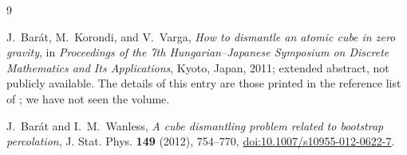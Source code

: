\documentclass[11pt]{amsart}
\begin{document}
\begin{thebibliography}{9}

J.~Bar\'at, M.~Korondi, and V.~Varga,
\emph{How to dismantle an atomic cube in zero gravity},
in \emph{Proceedings of the 7th Hungarian--Japanese Symposium on Discrete
Mathematics and Its Applications}, Kyoto, Japan, 2011; extended abstract, not
publicly available. The details of this entry are those printed in the
reference list of \cite{BW}; we have not seen the volume.

J.~Bar\'at and I.~M.~Wanless,
\emph{A cube dismantling problem related to bootstrap percolation},
J. Stat. Phys. \textbf{149} (2012), 754--770,
\href{https://doi.org/10.1007/s10955-012-0622-7}
{doi:10.1007/s10955-012-0622-7}.

\end{thebibliography}
\end{document}
